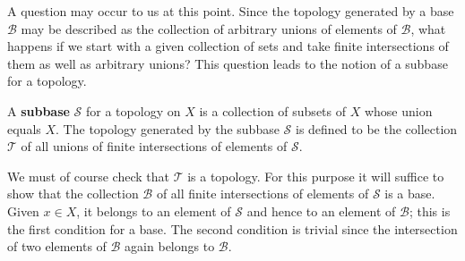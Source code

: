 A question may occur to us at this point. Since the topology generated by a base $\mathcal{B}$ may be described as the collection of arbitrary unions of elements of $\mathcal{B}$, what happens if we start with a given collection of sets and take finite intersections of them as well as arbitrary unions? This question leads to the notion of a subbase for a topology.
\begin{definition}
A \textbf{subbase} $\mathcal{S}$ for a topology on $X$ is a collection of subsets of $X$ whose union equals $X$. The topology generated by the subbase $\mathcal{S}$ is defined to be the collection $\mathcal{T}$ of all unions of finite intersections of elements of $\mathcal{S}$.
\end{definition}
We must of course check that $\mathcal{T}$ is a topology. For this purpose it will suffice to show that the collection $\mathcal{B}$ of all finite intersections of elements of $\mathcal{S}$ is a base. Given $x\in X$, it belongs to an element of $\mathcal{S}$ and hence to an element of $\mathcal{B}$; this is the first condition for a base. The second condition is trivial since the intersection of two elements of $\mathcal{B}$ again belongs to $\mathcal{B}$.
